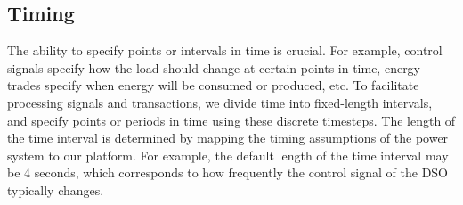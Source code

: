 \subsection{Timing}
The ability to specify points or intervals in time is crucial.
For example, control signals specify how the load should change at certain points in time, energy trades specify when energy will be consumed or produced, etc.
To facilitate processing signals and transactions, we divide time into fixed-length intervals, and specify points or periods in time using these discrete timesteps.
The length of the time interval is determined by mapping the timing assumptions of the power system to our platform.
For example, the default length of the time interval may be 4 seconds, which corresponds to how frequently the control signal of the DSO typically changes.





